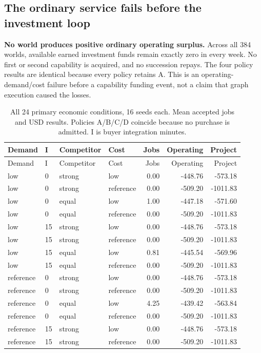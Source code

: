 \subsection{The ordinary service fails before the investment loop}

\textbf{No world produces positive ordinary operating surplus.} Across all 384 worlds,
available earned investment funds remain exactly zero in every week. No first or second
capability is acquired, and no succession repays. The four policy results are identical
because every policy retains A. This is an operating-demand/cost failure before a capability
funding event, not a claim that graph execution caused the losses.

\begin{longtable}{@{}llllrrr@{}}
\caption{All 24 primary economic conditions, 16 seeds each. Mean accepted jobs and USD results.
Policies A/B/C/D coincide because no purchase is admitted. I is buyer integration minutes.}\\
\toprule Demand & I & Competitor & Cost & Jobs & Operating & Project\\ \midrule\endfirsthead
\toprule Demand & I & Competitor & Cost & Jobs & Operating & Project\\ \midrule\endhead
low & 0 & strong & low & 0.00 & -448.76 & -573.18 \\
low & 0 & strong & reference & 0.00 & -509.20 & -1011.83 \\
low & 0 & equal & low & 1.00 & -447.18 & -571.60 \\
low & 0 & equal & reference & 0.00 & -509.20 & -1011.83 \\
low & 15 & strong & low & 0.00 & -448.76 & -573.18 \\
low & 15 & strong & reference & 0.00 & -509.20 & -1011.83 \\
low & 15 & equal & low & 0.81 & -445.54 & -569.96 \\
low & 15 & equal & reference & 0.00 & -509.20 & -1011.83 \\
reference & 0 & strong & low & 0.00 & -448.76 & -573.18 \\
reference & 0 & strong & reference & 0.00 & -509.20 & -1011.83 \\
reference & 0 & equal & low & 4.25 & -439.42 & -563.84 \\
reference & 0 & equal & reference & 0.00 & -509.20 & -1011.83 \\
reference & 15 & strong & low & 0.00 & -448.76 & -573.18 \\
reference & 15 & strong & reference & 0.00 & -509.20 & -1011.83 \\

\end{longtable}
